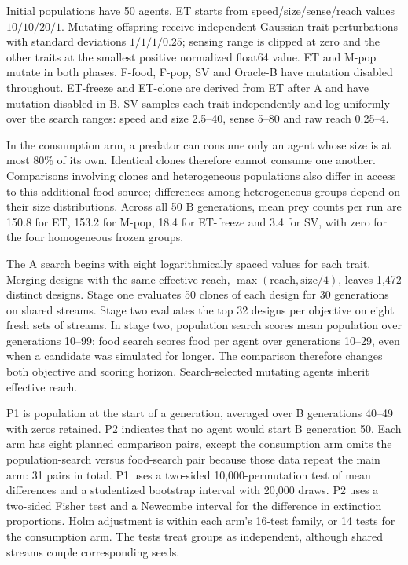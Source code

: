 Initial populations have 50 agents. ET starts from speed/size/sense/reach values $10/10/20/1$. Mutating offspring receive independent Gaussian trait perturbations with standard deviations $1/1/1/0.25$; sensing range is clipped at zero and the other traits at the smallest positive normalized float64 value. ET and M-pop mutate in both phases. F-food, F-pop, SV and Oracle-B have mutation disabled throughout. ET-freeze and ET-clone are derived from ET after A and have mutation disabled in B. SV samples each trait independently and log-uniformly over the search ranges: speed and size 2.5--40, sense 5--80 and raw reach 0.25--4.

In the consumption arm, a predator can consume only an agent whose size is at most 80\% of its own. Identical clones therefore cannot consume one another. Comparisons involving clones and heterogeneous populations also differ in access to this additional food source; differences among heterogeneous groups depend on their size distributions. Across all 50 B generations, mean prey counts per run are 150.8 for ET, 153.2 for M-pop, 18.4 for ET-freeze and 3.4 for SV, with zero for the four homogeneous frozen groups.

The A search begins with eight logarithmically spaced values for each trait. Merging designs with the same effective reach, $\max(\text{reach},\text{size}/4)$, leaves 1,472 distinct designs. Stage one evaluates 50 clones of each design for 30 generations on shared streams. Stage two evaluates the top 32 designs per objective on eight fresh sets of streams. In stage two, population search scores mean population over generations 10--99; food search scores food per agent over generations 10--29, even when a candidate was simulated for longer. The comparison therefore changes both objective and scoring horizon. Search-selected mutating agents inherit effective reach.

P1 is population at the start of a generation, averaged over B generations 40--49 with zeros retained. P2 indicates that no agent would start B generation 50. Each arm has eight planned comparison pairs, except the consumption arm omits the population-search versus food-search pair because those data repeat the main arm: 31 pairs in total. P1 uses a two-sided 10,000-permutation test of mean differences and a studentized bootstrap interval with 20,000 draws. P2 uses a two-sided Fisher test and a Newcombe interval for the difference in extinction proportions. Holm adjustment is within each arm's 16-test family, or 14 tests for the consumption arm. The tests treat groups as independent, although shared streams couple corresponding seeds.

